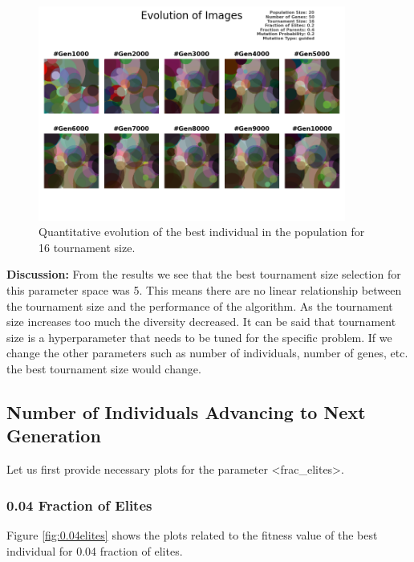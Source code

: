 \documentclass{assignment}
\begin{document}
\begin{figure}[!htb]
    \centering
    \includegraphics[width=0.9\textwidth]{figures/images_output_20_50_16_0.2_0.6_0.2_guided.png}
    \caption{Quantitative evolution of the best individual in the population for 16 tournament size.}
    \label{fig:16tm_image}
\end{figure}

\textbf{Discussion:} From the results we see that the best tournament size selection for this parameter space was 5. This means there are no linear relationship between the tournament size and the performance of the algorithm. As the tournament size increases too much the diversity decreased. It can be said that tournament size is a hyperparameter that needs to be tuned for the specific problem. If we change the other parameters such as number of individuals, number of genes, etc. the best tournament size would change.

\subsection{Number of Individuals Advancing to Next Generation}
Let us first provide necessary plots for the parameter \textless{}frac\_elites\textgreater{}.

\subsubsection{0.04 Fraction of Elites}
Figure \ref{fig:0.04elites} shows the plots related to the fitness value of the best individual for 0.04 fraction of elites.
\end{document}
